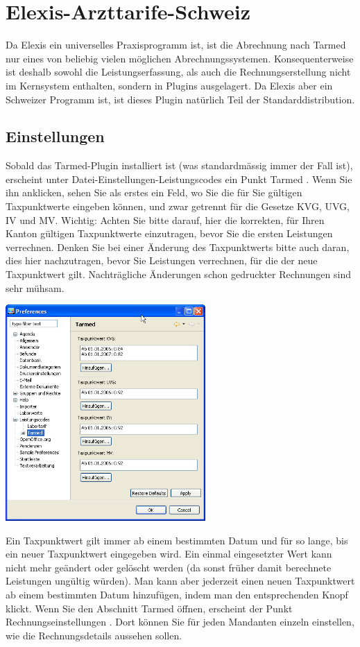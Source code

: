 \section{Elexis-Arzttarife-Schweiz}
\label{arzttarife}
Da Elexis ein universelles Praxisprogramm ist, ist die Abrechnung nach Tarmed nur eines von beliebig vielen
möglichen Abrechnungssystemen. Konsequenterweise ist deshalb sowohl die Leistungserfassung, als auch die
Rechnungserstellung nicht im Kernsystem enthalten, sondern in Plugins ausgelagert.
Da Elexis aber ein Schweizer Programm ist, ist dieses Plugin natürlich Teil der
Standarddistribution.
\subsection{Einstellungen}
Sobald das Tarmed-Plugin installiert ist (was standardmässig immer der Fall ist), erscheint unter
Datei-Einstellungen-Leistungscodes ein Punkt  Tarmed . Wenn Sie ihn anklicken, sehen Sie als erstes ein Feld,
wo Sie die für Sie gültigen Taxpunktwerte eingeben können, und zwar getrennt für die Gesetze KVG, UVG, IV und MV.
Wichtig: Achten Sie bitte darauf, hier die korrekten, für Ihren Kanton gültigen Taxpunktwerte einzutragen,
bevor Sie die ersten Leistungen verrechnen. Denken Sie bei einer Änderung des Taxpunktwerts bitte auch daran,
dies hier nachzutragen, bevor Sie Leistungen verrechnen, für die der neue Taxpunktwert gilt. Nachträgliche
Änderungen schon gedruckter Rechnungen sind sehr mühsam.

\includegraphics[width=3in]{images/tarmed1.png}

Ein Taxpunktwert gilt immer ab einem bestimmten Datum und für so lange, bis ein neuer Taxpunktwert eingegeben
wird. Ein einmal eingesetzter Wert kann nicht mehr geändert oder gelöscht werden (da sonst früher damit berechnete
Leistungen ungültig würden). Man kann aber jederzeit einen neuen Taxpunktwert ab einem bestimmten Datum hinzufügen,
 indem man den entsprechenden Knopf klickt.
Wenn Sie den Abschnitt Tarmed öffnen, erscheint der Punkt  Rechnungseinstellungen . Dort können Sie für jeden
Mandanten einzeln einstellen, wie die Rechnungsdetails aussehen sollen.

